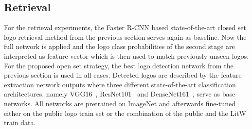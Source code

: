 \documentclass[a4paper,twoside]{article}
\begin{document}
\subsection{Retrieval}
For the retrieval experiments, the Faster R-CNN based state-of-the-art closed set logo retrieval method from the previous section serves again as baseline. Now the full network is applied and the logo class probabilities of the second stage are interpreted as feature vector which is then used to match previously unseen logos.
For the proposed open set strategy, the best logo detection network from the previous section is used in all cases. Detected logos are described by the feature extraction network outputs where three different state-of-the-art classification architectures, namely VGG16~\cite{simonyan2014}, ResNet101~\cite{he2015} and DenseNet161~\cite{huang2016}, serve as base networks. All networks are pretrained on ImageNet and afterwards fine-tuned either on the public logo train set or the combination of the public and the \ac{LitW} train data.
\end{document}
